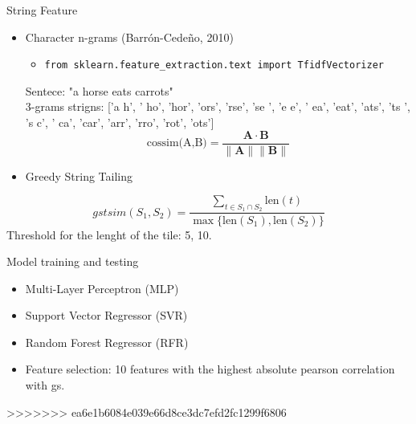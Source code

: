 \begin{frame}{String Feature}

    \begin{itemize}
        \item Character n-grams (Barrón-Cedeño, 2010)
        \vspace{0.2cm}
        \begin{itemize}
            \item \texttt{from sklearn.feature\_extraction.text import TfidfVectorizer} 
        \end{itemize}
        \vspace{0.2cm} 
        Sentece: "a horse eats carrots" \\ \vspace{0.2cm}
        3-grams strigns: ['a h', ' ho', 'hor', 'ors', 'rse', 'se ', 'e e', ' ea', 'eat', 'ats', 'ts ', 's c', ' ca', 'car', 'arr', 'rro', 'rot', 'ots']
        \[ 
            \text{cossim(A,B)} = \frac{\mathbf{A} \cdot \mathbf{B}}{\|\mathbf{A}\| \|\mathbf{B}\|}
             \]
    \end{itemize}

    \begin{itemize}
        \item Greedy String Tailing
    \end{itemize}
    \[
gstsim(S_1, S_2) = \frac{\sum_{t \in S_1 \cap S_2} \text{len}(t)}{\max \{ \text{len}(S_1), \text{len}(S_2) \}}
\]
        Threshold for the lenght of the tile: 5, 10. \\ \vspace{0.1cm}
\end{frame}

\begin{frame}{Model training and testing}
    \begin{itemize}
        \item Multi-Layer Perceptron (MLP)
        \item Support Vector Regressor (SVR)
        \item Random Forest Regressor (RFR)
    \end{itemize} 
    \vspace{1cm}
    \begin{itemize}
        \item Feature selection: 10 features with the highest absolute pearson correlation with gs.
    \end{itemize}

\end{frame}

>>>>>>> ea6e1b6084e039e66d8ce3dc7efd2fc1299f6806
